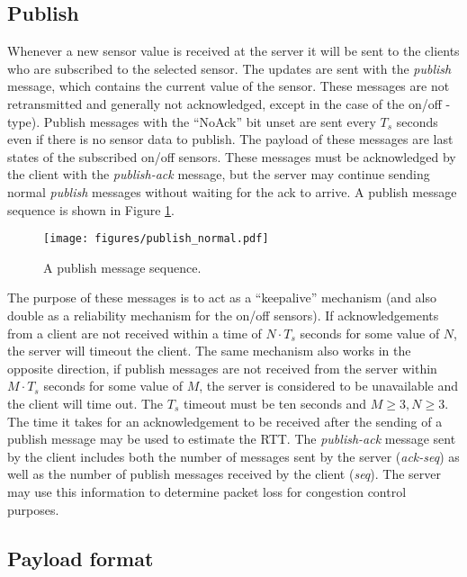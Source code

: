 \documentclass[a4paper]{article}
\begin{document}
\subsection{Publish}
Whenever a new sensor value is received at the server it will be sent to the 
clients who are subscribed to the selected sensor. The updates are sent with
the \emph{publish} message, which contains the current value of the sensor.
These messages are not retransmitted and generally not acknowledged, except in the case of the on/off -type). Publish
messages with the ``NoAck'' bit unset are sent every $T_s$ seconds even if there
is no sensor data to publish. The payload of these messages are last states
of the subscribed on/off sensors. These messages must be acknowledged by the client 
with the \emph{publish-ack} message, but the server may continue sending normal 
\emph{publish} messages without waiting for the ack to arrive. A publish message
sequence is shown in Figure \ref{fig:pub_normal}.

\begin{figure}
	\centering
    \texttt{[image: figures/publish\_normal.pdf]}
    \caption{A publish message sequence.}
    \label{fig:pub_normal}
\end{figure}

The purpose of these messages is to act as a ``keepalive'' mechanism (and also double
as a reliability mechanism for the on/off sensors). If acknowledgements from a client
are not received within a time of $N \cdot T_s$ seconds for some value of $N$, the 
server will timeout the client. The same mechanism also works in the opposite 
direction, if publish messages are not received from the server within 
$M \cdot T_s$ seconds for some value of $M$,
the server is considered to be unavailable and the client will time out. The 
$T_s$ timeout must be ten seconds and $M \geq 3, N \geq 3$. The time it takes for an acknowledgement to be received after the sending of
a publish message may be used to estimate the RTT.
The \emph{publish-ack} message sent by the client includes both the number of messages sent by the server (\emph{ack-seq}) as well as the number of publish messages received by the client (\emph{seq}).
The server may use this information to determine packet loss for congestion control purposes.

\subsection{Payload format}
\label{payload-format}
\end{document}
